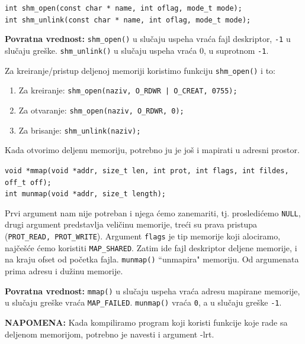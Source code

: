 \documentclass[a4paper, 11pt, twoside]{article}
\begin{document}
\begin{center}
	\texttt{int shm\_open(const char * name, int oflag, mode\_t mode);} \\
	\texttt{int shm\_unlink(const char * name, int oflag, mode\_t mode);}
\end{center}
\textbf{Povratna vrednost:} \texttt{shm\_open()} u slučaju uspeha vraća fajl deskriptor, \texttt{-1} u slučaju greške. \texttt{shm\_unlink()} u slučaju uspeha vraća 0, u suprotnom \texttt{-1}.

Za kreiranje/pristup deljenoj memoriji koristimo funkciju \texttt{shm\_open()} i to: 
\vspace{-2mm} 
\begin{enumerate}[1)]
	\item{Za kreiranje: \texttt{shm\_open(naziv, O\_RDWR | O\_CREAT, 0755);}}
	\item{Za otvaranje: \texttt{shm\_open(naziv, O\_RDWR, 0);}}
	\item{Za brisanje: \texttt{shm\_unlink(naziv);}}
\end{enumerate}
\vspace{-1mm} 

Kada otvorimo deljenu memoriju, potrebno ju je još i mapirati u adresni prostor.

\begin{center}
	\texttt{void *mmap(void *addr, size\_t len, int prot, int flags, int fildes, off\_t off);} \\
	\texttt{int munmap(void *addr, size\_t length);}
\end{center}

Prvi argument nam nije potreban i njega ćemo zanemariti, tj. prosledićemo \texttt{NULL}, drugi argument predstavlja veličinu memorije, treći su prava pristupa (\texttt{PROT\_READ, PROT\_WRITE}). Argument \texttt{flags} je tip memorije koji alociramo, najčešće ćemo koristiti \texttt{MAP\_SHARED}. Zatim ide fajl deskriptor deljene memorije, i na kraju ofset od početka fajla. \texttt{munmap()} ``unmapira" memoriju. Od argumenata prima adresu i dužinu memorije. 

\textbf{Povratna vrednost:} \texttt{mmap()} u slučaju uspeha vraća adresu mapirane memorije, u slučaju greške vraća \texttt{MAP\_FAILED}. \texttt{munmap()} vraća \texttt{0}, a u slučaju greške \texttt{-1}.

\vspace{2mm} 
\textbf{NAPOMENA:} Kada kompiliramo program koji koristi funkcije koje rade sa deljenom memorijom, potrebno je navesti i argument -lrt. 
\end{document}

